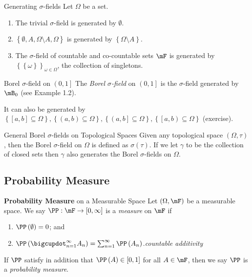 \documentclass[stat901]{subfiles}
\begin{document}
    \begin{example}{Generating $\sigma$-fields}
        Let $\Omega$ be a set.
        \begin{enumerate}
            \item The trivial $\sigma$-field is generated by $\emptyset$.
            \item $\left\lbrace \emptyset, A,\Omega\setminus A, \Omega \right\rbrace$ is generated by $\left\lbrace \Omega\setminus A \right\rbrace$.
            \item The $\sigma$-field of countable and co-countable sets $\mF$ is generated by $\left\lbrace \left\lbrace \omega \right\rbrace \right\rbrace^{}_{\omega\in\Omega}$, the collection of singletons.
        \end{enumerate}
    \end{example}

    \rruleline

    \begin{example}{Borel $\sigma$-field on $\left( 0,1 \right]$}
        The \emph{Borel $\sigma$-field} on $\left( 0,1 \right]$ is the $\sigma$-field generated by $\mB_0$ (see Example 1.2).

        It can also be generated by $\left\lbrace \left[ a,b \right]\subseteq\Omega \right\rbrace, \left\lbrace \left( a,b \right)\subseteq\Omega \right\rbrace, \left\lbrace \left( a,b \right]\subseteq\Omega \right\rbrace, \left\lbrace \left[ a,b \right)\subseteq\Omega \right\rbrace$ (exercise).
    \end{example}

    \rruleline

    \begin{example}{General Borel $\sigma$-fields on Topological Spaces}
        Given any topological space $\left( \Omega,\tau \right)$, then the Borel $\sigma$-field on $\Omega$ is defined as $\sigma\left( \tau \right)$. If we let $\gamma$ to be the collection of closed sets then $\gamma$ also generates the Borel $\sigma$-fields on $\Omega$.
    \end{example}

    \rruleline

    \subsection{Probability Measure}

    \begin{definition}{\textbf{Probability Measure} on a Measurable Space}
        Let $\left( \Omega,\mF \right)$ be a measurable space. We say $\PP:\mF\to\left[ 0,\infty \right]$ is a \emph{measure} on $\mF$ if
        \begin{enumerate}
            \item $\PP\left( \emptyset \right) = 0$; and
            \item $\PP\left( \bigcupdot^{\infty}_{n=1} A_n \right) = \sum^{\infty}_{n=1} \PP\left( A_n \right)$.\hfill\textit{countable additivity}
        \end{enumerate}
        If $\PP$ satisfy in addition that $\PP\left( A \right)\in\left[ 0,1 \right]$ for all $A\in\mF$, then we say $\PP$ is a \emph{probability measure}.
    \end{definition}
\end{document}
